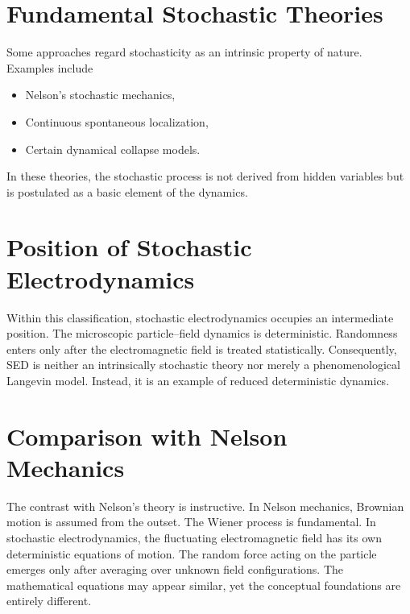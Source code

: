 \section{Fundamental Stochastic Theories}
Some approaches regard stochasticity as an intrinsic property of
nature.
Examples include
\begin{itemize}
\item
Nelson's stochastic mechanics,
\item
Continuous spontaneous localization,
\item
Certain dynamical collapse models.
\end{itemize}
In these theories,
the stochastic process is not derived from hidden variables but is
postulated as a basic element of the dynamics.
\section{Position of Stochastic Electrodynamics}
Within this classification,
stochastic electrodynamics occupies an intermediate position.
The microscopic particle--field dynamics is deterministic.
Randomness enters only after the electromagnetic field is treated
statistically.
Consequently,
SED is neither an intrinsically stochastic theory nor merely a
phenomenological Langevin model.
Instead,
it is an example of reduced deterministic dynamics.
\section{Comparison with Nelson Mechanics}
The contrast with Nelson's theory is instructive.
In Nelson mechanics,
Brownian motion is assumed from the outset.
The Wiener process is fundamental.
In stochastic electrodynamics,
the fluctuating electromagnetic field has its own deterministic
equations of motion.
The random force acting on the particle emerges only after averaging
over unknown field configurations.
The mathematical equations may appear similar,
yet the conceptual foundations are entirely different.
